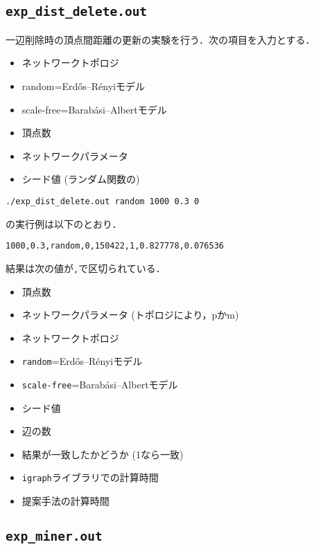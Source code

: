 \subsection*{\texorpdfstring{\texttt{exp\_dist\_delete.out}}{exp\_dist\_delete.out}}\label{expux5fdistux5fdelete.out}

一辺削除時の頂点間距離の更新の実験を行う．次の項目を入力とする．

\begin{itemize}
\tightlist
\item
  ネットワークトポロジ
\item
  random=Erdős--Rényiモデル
\item
  scale-free=Barabási--Albertモデル
\item
  頂点数
\item
  ネットワークパラメータ
\item
  シード値 (ランダム関数の)
\end{itemize}

\begin{verbatim}
./exp_dist_delete.out random 1000 0.3 0
\end{verbatim}

の実行例は以下のとおり．

\begin{verbatim}
1000,0.3,random,0,150422,1,0.827778,0.076536
\end{verbatim}

結果は次の値が\texttt{,}で区切られている．

\begin{itemize}
\tightlist
\item
  頂点数
\item
  ネットワークパラメータ (トポロジにより，pかm)
\item
  ネットワークトポロジ
\item
  \texttt{random}=Erdős--Rényiモデル
\item
  \texttt{scale-free}=Barabási--Albertモデル
\item
  シード値
\item
  辺の数
\item
  結果が一致したかどうか (1なら一致)
\item
  \texttt{igraph}ライブラリでの計算時間
\item
  提案手法の計算時間
\end{itemize}

\subsection*{\texorpdfstring{\texttt{exp\_miner.out}}{exp\_miner.out}}\label{expux5fminer.out}

